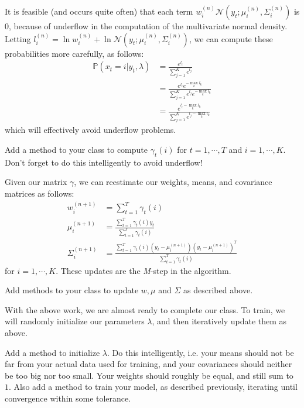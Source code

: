 It is feasible (and occurs quite often) that each term $w_{i}^{(n)}\mathcal{N}(y_{t} ; \mu_{i}^{(n)}, \Sigma_{i}^{(n)})$ is $0$, because of underflow in the computation of the multivariate normal density. Letting $l_{i}^{(n)} = \ln w_{i}^{(n)} + \ln \mathcal{N}(y_{t} ; \mu_{i}^{(n)}, \Sigma_{i}^{(n)})$, we can compute these probabilities more carefully, as follows:
\begin{align*}
\mathbb{P}(x_{t} = i | y_{t}, \lambda) & = \frac{e^{l_{i}}}{\sum_{j=1}^{K} e^{l_{j}}} \\
& = \frac{e^{l_{i}}e^{-\max_{k} l_{k}}}{\sum_{j=1}^{K} e^{l_{j}}e^{-\max_{k} l_{k}}} \\
& = \frac{e^{l_{i} - \max_{k} l_{k}}}{\sum_{j=1}^{K} e^{l_{j} - \max_{k} l_{k}}}
\end{align*}
which will effectively avoid underflow problems.

\begin{problem}
Add a method to your class to compute $\gamma_{t}(i)$ for $t = 1, \cdots, T$ and $i = 1, \cdots, K$. Don't forget to do this intelligently to avoid underflow!
\end{problem}

Given our matrix $\gamma$, we can reestimate our weights, means, and covariance matrices as follows:
\begin{align*}
w_{i}^{(n+1)} & = \sum_{t=1}^{T} \gamma_{t}(i) \\
\mu_{i}^{(n+1)} & = \frac{\sum_{t=1}^{T} \gamma_{t}(i) y_{t}}{\sum_{t=1}^{T} \gamma_{t}(i)} \\
\Sigma_{i}^{(n+1)} & = \frac{\sum_{t=1}^{T} \gamma_{t}(i) (y_{t} - \mu_{i}^{(n+1)}) (y_{t} - \mu_{i}^{(n+1)})^{T}}{\sum_{t=1}^{T} \gamma_{t}(i)}
\end{align*}
for $i = 1, \cdots, K$. These updates are the \emph{M}-step in the algorithm.

\begin{problem}
Add methods to your class to update $w, \mu$ and $\Sigma$ as described above.
\end{problem}

With the above work, we are almost ready to complete our class. To train, we will randomly initialize our parameters $\lambda$, and then iteratively update them as above.

\begin{problem}
Add a method to initialize $\lambda$. Do this intelligently, i.e. your means should not be far from your actual data used for training, and your covariances should neither be too big nor too small. Your weights should roughly be equal, and still sum to $1$. Also add a method to train your model, as described previously, iterating until convergence within some tolerance.
\end{problem}

